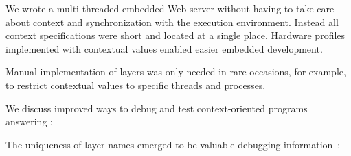 \begin{finding}
We wrote a multi-threaded embedded Web server without having to take care about context and synchronization with the execution environment.
Instead all context specifications were short and located at a single place.
Hardware profiles implemented with contextual values enabled easier embedded development.

Manual implementation of layers was only needed in rare occasions, for example, to restrict contextual values to specific threads and processes.
\end{finding}







































We discuss improved ways to debug and test context-oriented programs answering :
\rqImplicationDebuggingSupport*

The uniqueness of layer names emerged to be valuable debugging information~\cite{raab2014program}:

